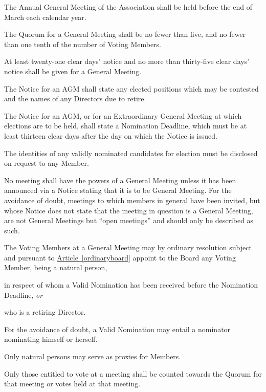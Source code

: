 \documentclass[12pt]{article}
\newcommand{\EC}[0]{Board}
\newcommand{\Exec}[0]{\EC{} }
\newcommand{\avoiddoubt}[0]{For the avoidance of doubt}
\newcommand{\ITor}[0]{\textit{or}}
\newcommand{\articleref}[1]{\hyperref[#1]{Article~\ref*{#1}}}
\begin{document}
\begin{constenum}

  \item The Annual General Meeting of the Association shall be
    held before the end of March each calendar year.\label{agmschedule}

  \item The Quorum for a General Meeting shall be no fewer than five, and
    no fewer than one tenth of the number of Voting Members.\label{quorum}

  \item At least twenty-one clear days' notice and no more than
    thirty-five clear days' notice shall be given for a General
    Meeting.

  \item The Notice for an AGM shall state any elected positions which
    may be contested and the names of any Directors due to retire.

  \item The Notice for an AGM, or for an Extraordinary General Meeting
    at which elections are to be held, shall state a Nomination
    Deadline, which must be at least thirteen clear days after the day
    on which the Notice is issued.

  \item The identities of any validly nominated candidates for
    election must be disclosed on request to any Member.

  \item No meeting shall have the powers of a General Meeting unless
    it has been announced via a Notice stating that it is to be
    General Meeting.  \avoiddoubt, meetings to which members in
    general have been invited, but whose Notice does not state that
    the meeting in question is a General Meeting, are not General
    Meetings but ``open meetings'' and should only be described as such.

  \item The Voting Members at a General Meeting may by ordinary
    resolution subject and pursuant to \articleref{ordinaryboard}
    appoint to the \Exec any Voting Member, being a natural person,
    \begin{constenum}
      \item in respect of whom a Valid Nomination has been received
        before the Nomination Deadline, \ITor
      \item who is a retiring Director.
    \end{constenum}

  \item \avoiddoubt, a Valid Nomination may entail a nominator nominating
    himself or herself.

  \item Only natural persons may serve as proxies for Members.

  \item Only those entitled to vote at a meeting shall be counted towards
    the Quorum for that meeting or votes held at that meeting.

\end{constenum}
\end{document}
